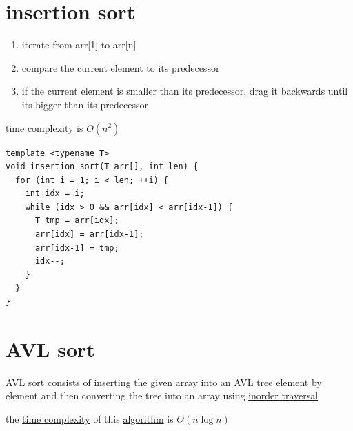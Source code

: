 \documentclass[a4paper,12pt]{article}
\begin{document}
\section{insertion sort}
\label{sec:org1bedc24}
\begin{enumerate}
\item iterate from arr[1] to arr[n]\\
\item compare the current element to its predecessor\\
\item if the current element is smaller than its predecessor, drag it backwards until its bigger than its predecessor\\
\end{enumerate}
\href{20221130014441-time_complexity.org}{time complexity} is \(O(n^2)\)\\

\lstset{language=C++,label=orgae738a1,caption= ,captionpos=b,numbers=none}
\begin{lstlisting}
template <typename T>
void insertion_sort(T arr[], int len) {
  for (int i = 1; i < len; ++i) {
    int idx = i;
    while (idx > 0 && arr[idx] < arr[idx-1]) {
      T tmp = arr[idx];
      arr[idx] = arr[idx-1];
      arr[idx-1] = tmp;
      idx--;
    }
  }
}
\end{lstlisting}

\section{AVL sort}
\label{sec:orgdaae231}
AVL sort consists of inserting the given array into an \href{data_structures.org}{AVL tree} element by element and then converting the tree into an array using \href{data_structures.org}{inorder traversal}\\
\begin{lemma}
the \href{20221130014441-time_complexity.org}{time complexity} of this \href{20220706211958-algorithm.org}{algorithm} is \(\Theta(n\log n)\)\\
\end{lemma}
\end{document}
